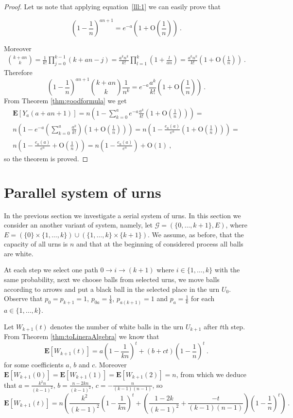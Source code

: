 \documentclass[submission]{dmtcs}
\newcommand{\E}[1]{\mathbf{E}\left[#1\right]}
\newcommand{\BigO}[1]{\mathrm{O}\left(#1\right)}
\begin{document}
\begin{proof}

Let us note that applying equation~\ref{lll:1} we can easily prove that 

$$(1-\frac1n)^{an+1} = e^{-a}(1+\BigO{\frac1n})~.$$

Moreover
\begin{gather*}
\binom{k+a n}{k} = \frac{1}{k!} \prod_{j=0}^{k-1} (k+an-j) = 
\frac{a^k n^k}{k!} \prod_{l=1}^{k} (1+\frac{l}{a n}) =
\frac{a^k n^k}{k!}(1+\BigO{\frac1n})~.
\end{gather*}
Therefore
$$
(1-\frac1n)^{an+1} \binom{k+a n}{k} \frac{1}{n^k} = 
e^{-a} \frac{a^k}{k!}(1+\BigO{\frac1n})~.
$$
From Theorem \ref{thm:goodformula} we get
\begin{gather*}
 \E{Y_a(a+an+1)} = 
 n\left(1 - \sum_{k=0}^{a} e^{-a} \frac{a^k}{k!}(1+\BigO{\frac1n})\right) = \\
 n\left(1 - e^{-a} (\sum_{k=0}^{a} \frac{a^k}{k!}) (1+\BigO{\frac1n})\right) = 
 n\left(1 - \frac{e_a(a)}{e^a} (1+\BigO{\frac1n})\right) = \\
 n\left(1 - \frac{e_a(a)}{e^a} + \BigO{\frac1n}\right) =
 n\left(1 - \frac{e_a(a)}{e^a}\right) + \BigO{1}~,
\end{gather*}
so the theorem is proved.
\end{proof}




\section{Parallel system of urns}\label{Parallel}

In the previous section we investigate a serial system of urns.
In this section we consider an another variant of system,
namely, let $\mathcal{G} = (\{0,\ldots,k+1\},E)$, where
$E= (\{0\}\times\{1,\ldots,k\}) \cup (\{1,\ldots,k\}\times\{k+1\})$.
We assume, as before, that the capacity of all urns is $n$ and that at the 
beginning of considered process all balls are white.

At each step we select one path $0 \to i \to (k+1)$ where $i \in \{1,\ldots,k\}$ 
with the same probability, next we choose balls from selected urns, we move balls according 
to arrows and put a black ball in the selected place in the urn $U_0$.
Observe that $p_0=p_{k+1}=1$, $p_{0a} = \frac1k$, $p_{a(k+1)} = 1$ and 
$p_a  = \frac1k$ for each  $a \in \{1,\ldots,k\}$.

Let $W_{k+1}(t)$ denotes the number of white balls in the urn $U_{k+1}$ 
after $t$th step.
From Theorem \ref{thm:toLineraAlgebra} we know that
$$
  \E{W_{k+1}(t)} = a (1-\frac{1}{k n})^t + (b + c t)(1-\frac1n)^t~. 
$$
for some coefficients $a$, $b$ and $c$. Moreover 
$\E{W_{k+1}(0)} = \E{W_{k+1}(1)} = \E{W_{k+1}(2)} = n$, 
from which we deduce that 
$a = \frac{k^2 n}{(k-1)^2}$, 
$b = \frac{n-2 k n}{(k-1)^2}$,
$c = -\frac{n}{(k-1) (n-1)}$, so
$$
  \E{W_{k+1}(t)} = n
	\left( 
	\frac{k^2}{(k-1)^2}\left(1-\frac{1}{k n}\right)^t + 
	\left(\frac{1-2 k}{(k-1)^2} + \frac{-t}{(k-1) (n-1)} \right)
	\left(1-\frac1n\right)^t
	\right)~. 
$$
\end{document}
